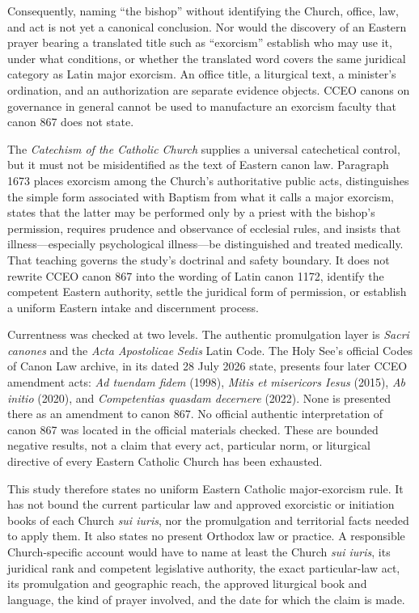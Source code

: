 Consequently, naming ``the bishop'' without identifying the Church, office,
law, and act is not yet a canonical conclusion. Nor would the discovery of an
Eastern prayer bearing a translated title such as ``exorcism'' establish who
may use it, under what conditions, or whether the translated word covers the
same juridical category as Latin major exorcism. An office title, a liturgical
text, a minister's ordination, and an authorization are separate evidence
objects. CCEO canons on governance in general cannot be used to manufacture an
exorcism faculty that canon 867 does not state.

The \emph{Catechism of the Catholic Church} supplies a universal catechetical
control, but it must not be misidentified as the text of Eastern canon law.
Paragraph 1673 places exorcism among the Church's authoritative public acts,
distinguishes the simple form associated with Baptism from what it calls a
major exorcism, states that the latter may be performed only by a priest with
the bishop's permission, requires prudence and observance of ecclesial rules,
and insists that illness---especially psychological illness---be
distinguished and treated medically. That teaching governs the study's
doctrinal and safety boundary. It does not rewrite CCEO canon 867 into the
wording of Latin canon 1172, identify the competent Eastern authority, settle
the juridical form of permission, or establish a uniform Eastern intake and
discernment process.

Currentness was checked at two levels. The authentic promulgation layer is
\emph{Sacri canones} and the \emph{Acta Apostolicae Sedis} Latin Code. The
Holy See's official Codes of Canon Law archive, in its dated 28 July 2026
state, presents four later CCEO amendment acts: \emph{Ad tuendam fidem}
(1998), \emph{Mitis et misericors Iesus} (2015), \emph{Ab initio} (2020),
and \emph{Competentias quasdam decernere} (2022). None is presented there as
an amendment to canon 867. No official authentic interpretation of canon 867
was located in the official materials checked. These are bounded negative
results, not a claim that every act, particular norm, or liturgical directive
of every Eastern Catholic Church has been exhausted.

This study therefore states no uniform Eastern Catholic major-exorcism rule.
It has not bound the current particular law and approved exorcistic or
initiation books of each Church \emph{sui iuris}, nor the promulgation and
territorial facts needed to apply them. It also states no present Orthodox
law or practice. A responsible Church-specific account would have to name at
least the Church \emph{sui iuris}, its juridical rank and competent
legislative authority, the exact particular-law act, its promulgation and
geographic reach, the approved liturgical book and language, the kind of
prayer involved, and the date for which the claim is made.

